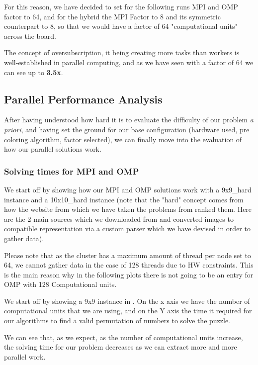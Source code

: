 For this reason, we have decided to set for the following runs MPI and OMP factor to 64, and for the hybrid the MPI Factor to 8 and its symmetric counterpart to 8, so that we would have a factor of 64 "computational units" across the board.


The concept of oversubscription, it being creating more tasks than workers is well-established in parallel computing, and as we have seen with a factor of 64 we can see up to \textbf{3.5x}.

\subsection{Parallel Performance Analysis}
\label{subsec:parallel_performance_analysis}

After having understood how hard it is to evaluate the difficulty of our problem \textit{a priori}, and having set the ground for our base configuration (hardware used, pre coloring algorithm, factor selected), we can finally move into the evaluation of how our parallel solutions work.

\subsubsection{Solving times for MPI and OMP}
\label{subsubsec:solving_times_mpi_omp}

We start off by showing how our MPI and OMP solutions work with a 9x9\_hard instance and a 10x10\_hard instance (note that the "hard" concept comes from how the website from which we have taken the problems from ranked them. Here are the 2 main sources which we downloaded from \cite{puzzle_futoshiki,puddelbee} and converted images to compatible representation via a custom parser which we have devised in order to gather data).

Please note that as the cluster has a maximum amount of thread per node set to 64, we cannot gather data in the case of 128 threads due to HW constraints. This is the main reason why in the following plots there is not going to be an entry for OMP with 128 Computational units.


We start off by showing a 9x9 instance in . On the x axis we have the number of computational units that we are using, and on the Y axis the time it required for our algorithms to find a valid permutation of numbers to solve the puzzle.

We can see that, as we expect, as the number of computational units increase, the solving time for our problem decreases as we can extract more and more parallel work.

